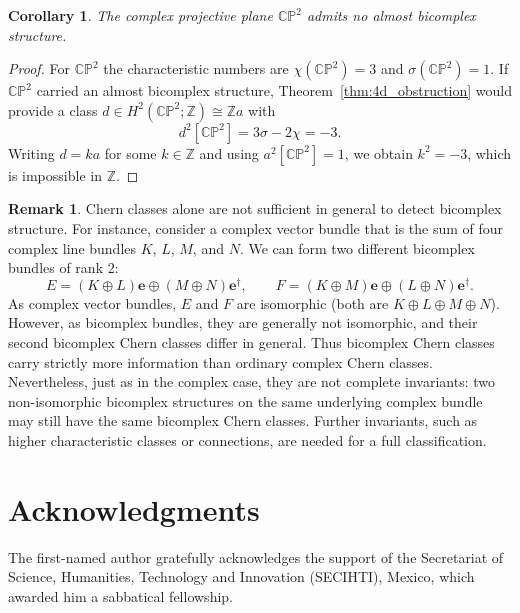 \documentclass[11pt]{amsart}
\newcommand{\C}{\mathbb{C}}          %
\newcommand{\Z}{\mathbb{Z}}
\renewcommand{\P}{\mathbb{P}}
\newcommand{\e}{\mathbf{e}}          %
\newcommand{\ed}{\mathbf{e}^\dagger} %
\newtheorem{cor}[prop]{Corollary}         %
\theoremstyle{definition}
\newtheorem{remark}[prop]{Remark}            %
\begin{document}
\begin{cor}
The complex projective plane $\C\P^2$ admits no almost bicomplex structure.
\end{cor}

\begin{proof}
For $\C\P^2$ the characteristic numbers are $\chi(\C\P^{2})=3$ and $\sigma(\C\P^2)=1$. If $\C\P^2$ carried an almost bicomplex structure, Theorem~\ref{thm:4d_obstruction} would provide a class $d\in H^2(\C\P^2;\Z)\cong\Z a$ with
\begin{equation*}
d^{2}[\C\P^2]=3\sigma-2\chi=-3.
\end{equation*}
Writing $d=ka$ for some $k\in\mathbb{Z}$ and using $a^{2}[\C\P^2]=1$, we obtain $k^2=-3$, which is impossible in $\Z$.
\end{proof}

\begin{remark}\label{rem:chern_detection}
     Chern classes alone are not sufficient in general to detect bicomplex structure. For instance, consider a complex vector bundle that is the sum of four complex line bundles $K$, $L$, $M$, and $N$. We can form two different bicomplex bundles of rank $2$:
    \begin{equation*}
        E = (K \oplus L)\e \oplus (M \oplus N)\ed,
        \qquad
        F = (K \oplus M)\e \oplus (L \oplus N)\ed.
    \end{equation*}
    As complex vector bundles, $E$ and $F$ are isomorphic (both are $K \oplus L \oplus M \oplus N$). However, as bicomplex bundles, they are generally not isomorphic, and their second bicomplex Chern classes differ in general. Thus bicomplex Chern classes carry strictly more information than ordinary complex Chern classes. Nevertheless, just as in the complex case, they are not complete invariants: two non-isomorphic bicomplex structures on the same underlying complex bundle may still have the same bicomplex Chern classes. Further invariants, such as higher characteristic classes or connections, are needed for a full classification.
\end{remark}

\section*{Acknowledgments}

The first-named author gratefully acknowledges the support of the Secretariat of Science, Humanities, Technology and Innovation (SECIHTI), Mexico, which awarded him a sabbatical fellowship.
\end{document}
